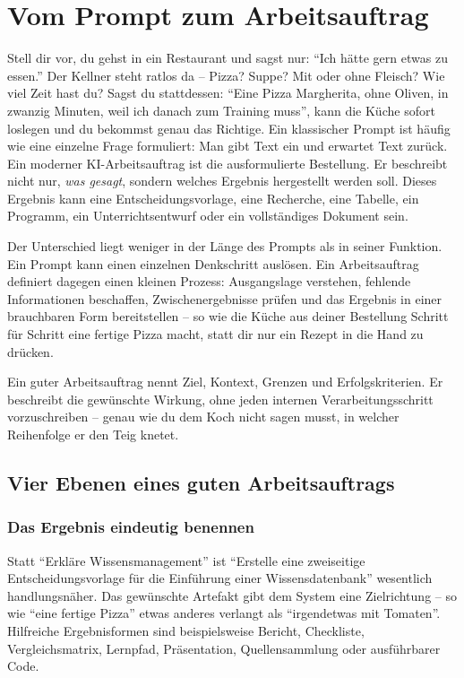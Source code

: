 \chapter{Vom Prompt zum Arbeitsauftrag}

Stell dir vor, du gehst in ein Restaurant und sagst nur: ``Ich hätte gern etwas zu essen.'' Der Kellner steht ratlos da -- Pizza? Suppe? Mit oder ohne Fleisch? Wie viel Zeit hast du? Sagst du stattdessen: ``Eine Pizza Margherita, ohne Oliven, in zwanzig Minuten, weil ich danach zum Training muss'', kann die Küche sofort loslegen und du bekommst genau das Richtige. Ein klassischer Prompt ist häufig wie eine einzelne Frage formuliert: Man gibt Text ein und erwartet Text zurück. Ein moderner KI-Arbeitsauftrag ist die ausformulierte Bestellung. Er beschreibt nicht nur, \emph{was gesagt}, sondern welches Ergebnis hergestellt werden soll. Dieses Ergebnis kann eine Entscheidungsvorlage, eine Recherche, eine Tabelle, ein Programm, ein Unterrichtsentwurf oder ein vollständiges Dokument sein.

Der Unterschied liegt weniger in der Länge des Prompts als in seiner Funktion. Ein Prompt kann einen einzelnen Denkschritt auslösen. Ein Arbeitsauftrag definiert dagegen einen kleinen Prozess: Ausgangslage verstehen, fehlende Informationen beschaffen, Zwischenergebnisse prüfen und das Ergebnis in einer brauchbaren Form bereitstellen -- so wie die Küche aus deiner Bestellung Schritt für Schritt eine fertige Pizza macht, statt dir nur ein Rezept in die Hand zu drücken.



\begin{merke}
Ein guter Arbeitsauftrag nennt Ziel, Kontext, Grenzen und Erfolgskriterien. Er beschreibt die gewünschte Wirkung, ohne jeden internen Verarbeitungsschritt vorzuschreiben -- genau wie du dem Koch nicht sagen musst, in welcher Reihenfolge er den Teig knetet.
\end{merke}

\section{Vier Ebenen eines guten Arbeitsauftrags}

\subsection{Das Ergebnis eindeutig benennen}
Statt ``Erkläre Wissensmanagement'' ist ``Erstelle eine zweiseitige Entscheidungsvorlage für die Einführung einer Wissensdatenbank'' wesentlich handlungsnäher. Das gewünschte Artefakt gibt dem System eine Zielrichtung -- so wie ``eine fertige Pizza'' etwas anderes verlangt als ``irgendetwas mit Tomaten''. Hilfreiche Ergebnisformen sind beispielsweise Bericht, Checkliste, Vergleichsmatrix, Lernpfad, Präsentation, Quellensammlung oder ausführbarer Code.

